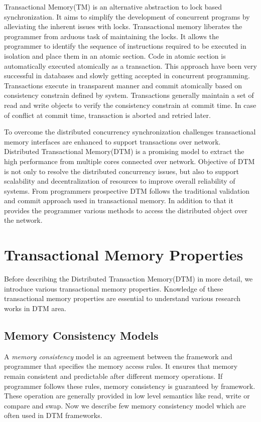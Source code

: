 \documentclass[12pt,english]{report}
\begin{document}
Transactional Memory(TM) is an alternative abstraction to lock based synchronization. It aims to simplify the development of concurrent programs by alleviating the inherent issues with locks. Transactional memory liberates the programmer from arduous task of maintaining the locks. It allows the programmer to identify the  sequence of instructions required to be executed in isolation and place them in an atomic section. Code in atomic section is automatically executed atomically as a transaction. This approach have been very successful in databases and slowly getting accepted in concurrent programming. Transactions execute in transparent manner and commit atomically based on consistency constrain defined by system. Transactions generally maintain a set of read and write objects to verify the consistency constrain at commit time. In case of conflict at commit time, transaction is aborted and retried later.      

To overcome the distributed concurrency synchronization challenges transactional memory interfaces are enhanced to support transactions over network. Distributed Transactional Memory(DTM) is a promising model to extract the high performance from multiple cores connected over network. Objective of DTM is not only to resolve the distributed concurrency issues, but also to support scalability and decentralization of resources to improve overall reliability of systems. From programmers prospective DTM follows the traditional validation and commit approach used in transactional memory. In addition to that it provides the programmer various methods to access the distributed object over the network. 

\section{Transactional Memory Properties}

Before describing the Distributed Transaction Memory(DTM) in more detail, we introduce various transactional memory properties. Knowledge of these transactional memory properties are essential to understand various research works in DTM area.

\subsection{Memory Consistency Models}

A \textit{memory consistency} model is an agreement between the framework and programmer that specifies the memory access rules. It ensures that memory remain consistent and predictable after different memory operations. If programmer follows these rules, memory consistency is guaranteed by framework. These operation are generally provided in low level semantics like read, write or compare and swap. Now we describe few memory consistency model which are often used in DTM frameworks.
\end{document}
